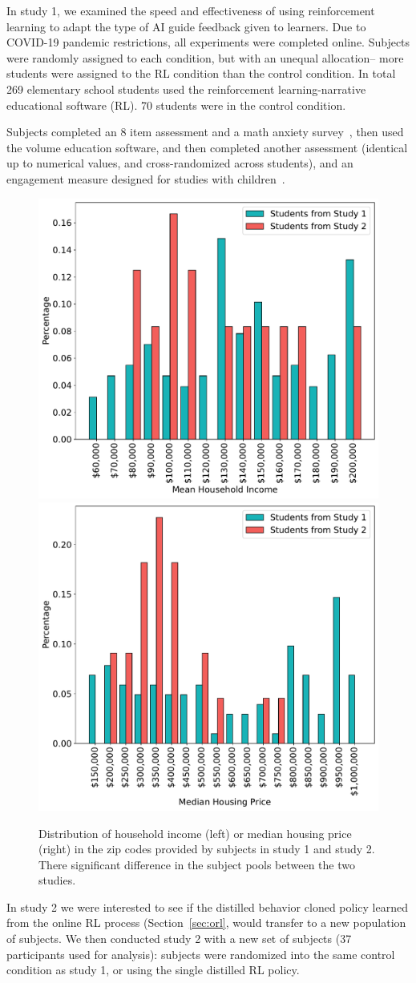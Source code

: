 \documentclass[sn-mathphys,Numbered]{sn-jnl}%
\theoremstyle{thmstyleone}%
\theoremstyle{thmstyletwo}%
\theoremstyle{thmstylethree}%
\begin{document}
In study 1, we examined the speed and effectiveness of using reinforcement learning to adapt the type of AI guide feedback given to learners. Due to COVID-19 pandemic restrictions, all experiments were completed online. Subjects were randomly assigned to each condition, but with an unequal allocation-- more students were assigned to the RL condition than the control condition. In total 269 elementary school students used the reinforcement learning-narrative educational software (RL). 70 students were in the control condition.   


Subjects completed an 8 item assessment and a math anxiety survey~\cite{carey2017modified}, then used the volume education software, and then completed another assessment (identical up to numerical values, and cross-randomized across students), and an engagement measure designed for studies with children~\cite{giggle_gauge}. 



\begin{figure}[bt!]
  \centering
  \includegraphics[width=.45\linewidth]{Figures/mean_household_income.pdf}\quad
  \includegraphics[width=.45\linewidth]{Figures/median_housing_price.pdf}
  \caption{Distribution of household income (left) or median housing price (right) in the zip codes provided by subjects in study 1 and study 2. There significant difference in the subject pools between the two studies.}
      \label{rlbot:fig:dist_shift}
\end{figure}
In study 2 we were interested to see if the distilled behavior cloned policy learned from the online RL process (Section~\ref{sec:orl}, would transfer to a new population of subjects. 
We then conducted study 2 with a new set of subjects (37 participants used for analysis): subjects were randomized into the same control condition as study 1, or using the single distilled  RL policy. 
\end{document}
